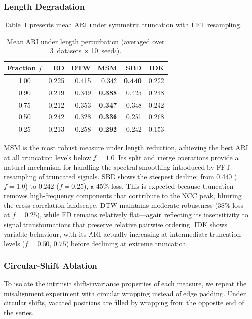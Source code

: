 \subsubsection{Length Degradation}\label{sec:results-length}

Table~\ref{tab:length-ari} presents mean ARI under symmetric truncation with FFT resampling.

\begin{table}[htbp]
\centering
\caption{Mean ARI under length perturbation (averaged over 3~datasets $\times$ 10~seeds).}\label{tab:length-ari}
\small
\begin{tabular}{c r r r r r}
\toprule
Fraction $f$ & ED & DTW & MSM & SBD & IDK \\
\midrule
1.00 & 0.225 & 0.415 & 0.342 & \textbf{0.440} & 0.222 \\
0.90 & 0.219 & 0.349 & \textbf{0.388} & 0.425 & 0.248 \\
0.75 & 0.212 & 0.353 & \textbf{0.347} & 0.348 & 0.242 \\
0.50 & 0.242 & 0.328 & \textbf{0.336} & 0.251 & 0.268 \\
0.25 & 0.213 & 0.258 & \textbf{0.292} & 0.242 & 0.153 \\
\bottomrule
\end{tabular}
\end{table}

MSM is the most robust measure under length reduction, achieving the best ARI at all truncation levels below $f = 1.0$.
Its split and merge operations provide a natural mechanism for handling the spectral smoothing introduced by FFT resampling of truncated signals.
SBD shows the steepest decline: from 0.440 ($f = 1.0$) to 0.242 ($f = 0.25$), a 45\% loss.
This is expected because truncation removes high-frequency components that contribute to the NCC peak, blurring the cross-correlation landscape.
DTW maintains moderate robustness (38\% loss at $f = 0.25$), while ED remains relatively flat---again reflecting its insensitivity to signal transformations that preserve relative pairwise ordering.
IDK shows variable behaviour, with its ARI actually increasing at intermediate truncation levels ($f = 0.50$, $0.75$) before declining at extreme truncation.

\subsubsection{Circular-Shift Ablation}\label{sec:results-circular}

To isolate the intrinsic shift-invariance properties of each measure, we repeat the misalignment experiment with circular wrapping instead of edge padding.
Under circular shifts, vacated positions are filled by wrapping from the opposite end of the series.

